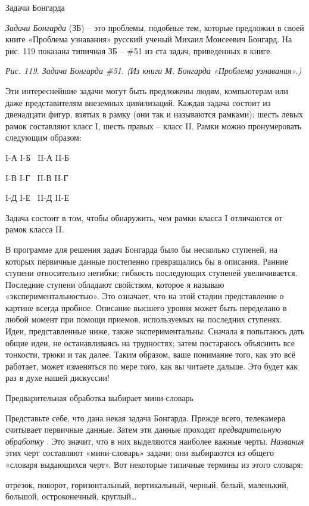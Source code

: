 \documentclass[../main.tex]{subfiles}
\begin{document}
Задачи Бонгарда

\emph{Задачи Бонгарда} (ЗБ) \--- это проблемы, подобные тем, которые предложил в своей книге «Проблема узнавания» русский ученый Михаил Моисеевич Бонгард. На рис. 119 показана типичная ЗБ \--- \#51 из ста задач, приведенных в книге.

\emph{Рис. 119. Задача Бонгарда \#51. (Из книги М. Бонгарда «Проблема узнавания».)}

Эти интереснейшие задачи могут быть предложены людям, компьютерам или даже представителям внеземных цивилизаций. Каждая задача состоит из двенадцати фигур, взятых в рамку (они так и называются рамками): шесть левых рамок составляют класс I, шесть правых \--- класс II. Рамки можно пронумеровать следующим образом:

I-А I-Б~ II-А II-Б

I-В I-Г~ II-В II-Г

I-Д I-Е~ II-Д II-Е

Задача состоит в том, чтобы обнаружить, чем рамки класса I отличаются от рамок класса II.

В программе для решения задач Бонгарда было бы несколько ступеней, на которых первичные данные постепенно превращались бы в описания. Ранние ступени относительно негибки; гибкость последующих ступеней увеличивается. Последние ступени обладают свойством, которое я называю «экспериментальностью». Это означает, что на этой стадии представление о картине всегда пробное. Описание высшего уровня может быть переделано в любой момент при помощи приемов, используемых на последних ступенях. Идеи, представленные ниже, также экспериментальны. Сначала я попытаюсь дать общие идеи, не останавливаясь на трудностях; затем постараюсь объяснить все тонкости, трюки и так далее. Таким образом, ваше понимание того, как это всё работает, может изменяться по мере того, как вы читаете дальше. Это будет как раз в духе нашей дискуссии!

Предварительная обработка выбирает мини-словарь

Представьте себе, что дана некая задача Бонгарда. Прежде всего, телекамера считывает первичные данные. Затем эти данные проходят \emph{предварительную обработку} . Это значит, что в них выделяются наиболее важные черты. \emph{Названия} этих черт составляют «мини-словарь» задачи; они выбираются из общего «словаря выдающихся черт». Вот некоторые типичные термины из этого словаря:

отрезок, поворот, горизонтальный, вертикальный, черный, белый, маленький, большой, остроконечный, круглый\ldots{}
\end{document}
